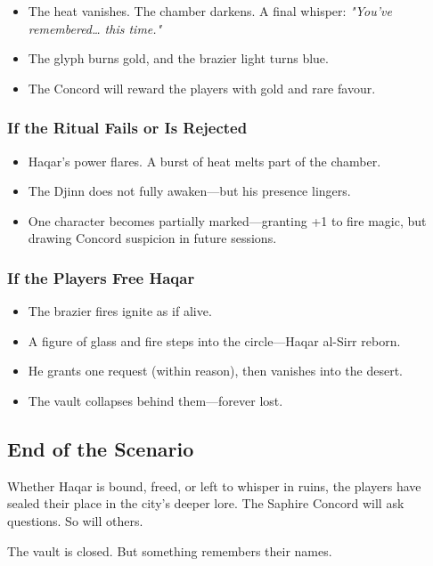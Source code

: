 \begin{itemize}
    \item The heat vanishes. The chamber darkens. A final whisper: \textit{"You’ve remembered… this time."}
    \item The glyph burns gold, and the brazier light turns blue.
    \item The Concord will reward the players with gold and rare favour.
\end{itemize}

\subsubsection*{If the Ritual Fails or Is Rejected}

\begin{itemize}
    \item Haqar’s power flares. A burst of heat melts part of the chamber.
    \item The Djinn does not fully awaken—but his presence lingers.
    \item One character becomes partially marked—granting +1 to fire magic, but drawing Concord suspicion in future sessions.
\end{itemize}

\subsubsection*{If the Players Free Haqar}

\begin{itemize}\raggedright
    \item The brazier fires ignite as if alive.
    \item A figure of glass and fire steps into the circle—Haqar al-Sirr reborn.
    \item He grants one request (within reason), then vanishes into the desert.
    \item The vault collapses behind them—forever lost.
\end{itemize}

\subsection*{End of the Scenario}

Whether Haqar is bound, freed, or left to whisper in ruins, the players have sealed their place in the city’s deeper lore. The Saphire Concord will ask questions. So will others.

The vault is closed. But something remembers their names.

